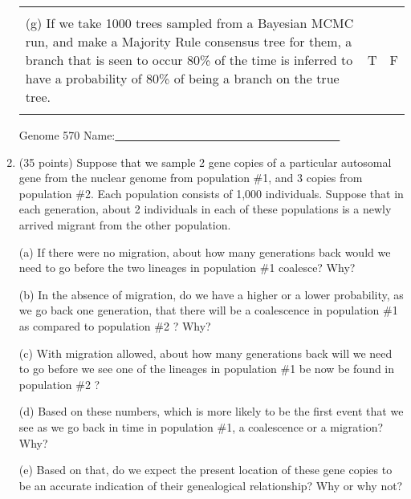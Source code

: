 \documentclass[12pt]{article}
\begin{document}
\begin{enumerate}
\begin{tabular}{l | c | c |}
& & \\
\parbox[t]{5in}{(g) If we take 1000 trees sampled from a Bayesian MCMC run, and
make a Majority Rule consensus tree for them, a branch that is seen to occur
80\% of the time is inferred to have a probability of 80\% of being a branch
on the true tree. } & \hspace{0.2in}
T\hspace{0.2in} &\hspace{0.2in} F\hspace{0.2in} \\
& & \\
\end{tabular}


\vfill



\newpage
\noindent
Genome 570 \hfill Name:\underline{~~~~~~~~~~~~~~~~~~~~~~~~~~~~~~~~~~~~~~~~}\\
\medskip

\item (35 points)  Suppose that we sample 2 gene copies of a particular autosomal
gene from the nuclear genome from population \#1, and
3 copies from population \#2.  Each population consists of 1,000 individuals.
Suppose that in each generation, about 2 individuals
in each of these populations is a newly arrived migrant from the other
population.
\medskip

(a)  If there were no migration, about how many generations back would we need to go before the two
lineages in population \#1 coalesce?  Why?
\vfill

(b) In the absence of migration, do we have a higher or a lower probability, as we go back one generation,
that there will be a coalescence in population \#1 as compared to
population \#2 ?  Why?
\vfill

(c) With migration allowed, about how many generations back will we need to go before we see one
of the lineages in population \#1 be now be found in population \#2 ?
\vfill

(d) Based on these numbers, which is more likely to be the first event that we
see as we go back in time in
population \#1, a coalescence or a migration?  Why?
\vfill

(e) Based on that, do we expect the present location of these gene copies to
be an accurate indication of their genealogical relationship?  Why or why not?
\vfill

\end{enumerate}
\end{document}
